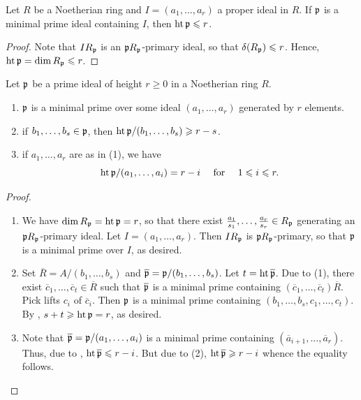 \begin{theorem}
    Let $R$ be a Noetherian ring and $I = (a_1,\dots,a_r)$ a proper ideal in $R$. If $\mathfrak{p}$ is a minimal prime ideal containing $I$, then $\operatorname{ht}\mathfrak{p}\leqslant r$.
\end{theorem}
\begin{proof}
    Note that $I R_{\mathfrak{p}}$ is an $\mathfrak{p} R_{\mathfrak{p}}$-primary ideal, so that $\delta(R_{\mathfrak{p}})\leqslant r$. Hence, $\operatorname{ht}\mathfrak{p} = \dim R_{\mathfrak{p}}\leqslant r$.
\end{proof}

\begin{theorem}
    Let $\mathfrak{p}$ be a prime ideal of height $r\ge 0$ in a Noetherian ring $R$. 
    \begin{enumerate}[label=(\arabic*)]
        \item $\mathfrak{p}$ is a minimal prime over some ideal $(a_1,\dots,a_r)$ generated by $r$ elements.
        \item if $b_1,\dots,b_s\in\mathfrak{p}$, then $\operatorname{ht}\mathfrak{p}/(b_1,\dots,b_s)\geqslant r - s$.
        \item if $a_1,\dots,a_r$ are as in (1), we have 
        \begin{equation*}
            \operatorname{ht}\mathfrak{p}/(a_1,\dots,a_i) = r - i\quad\text{ for }\quad 1\leqslant i\leqslant r.
        \end{equation*}
    \end{enumerate}
\end{theorem}
\begin{proof}
\begin{enumerate}[label=(\arabic*)]
    \item We have $\dim R_{\mathfrak{p}} = \operatorname{ht}\mathfrak{p} = r$, so that there exist $\frac{a_1}{s_1},\dots,\frac{a_r}{s_r}\in R_{\mathfrak{p}}$ generating an $\mathfrak{p} R_{\mathfrak{p}}$-primary ideal. Let $I = (a_1,\dots,a_r)$. Then $IR_{\mathfrak{p}}$ is $\mathfrak{p} R_{\mathfrak{p}}$-primary, so that $\mathfrak{p}$ is a minimal prime over $I$, as desired. 
    \item Set $\overline R = A/(b_1,\dots,b_s)$ and $\overline{\mathfrak{p}} = \mathfrak{p}/(b_1,\dots,b_s)$. Let $t = \operatorname{ht}\overline{\mathfrak{p}}$. Due to (1), there exist $\overline c_1,\dots,\overline c_t\in\overline R$ such that $\overline{\mathfrak{p}}$ is a minimal prime containing $(\overline c_1,\dots,\overline c_t)\overline R$. Pick lifts $c_i$ of $\overline c_i$. Then $\mathfrak{p}$ is a minimal prime containing $(b_1,\dots,b_s,c_1,\dots,c_t)$. By , $s + t\geqslant\operatorname{ht}\mathfrak{p} = r$, as desired. 
    \item Note that $\overline{\mathfrak{p}} = \mathfrak{p}/(a_1,\dots,a_i)$ is a minimal prime containing $(\overline a_{i + 1},\dots,\overline a_r)$. Thus, due to , $\operatorname{ht}\overline{\mathfrak{p}}\leqslant r - i$. But due to (2), $\operatorname{ht}\overline{\mathfrak{p}}\geqslant r - i$ whence the equality follows. \qedhere
\end{enumerate}
\end{proof}

